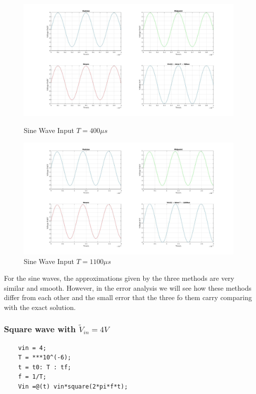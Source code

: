 \documentclass[11pt,a4paper]{article}
\begin{document}
\begin{figure}[h]
	\vspace{-5mm}
	\centering
	\includegraphics[width=\textwidth]{Ex1_Figs/sin400.jpg}
	\vspace{-10mm}
	\caption{Sine Wave Input $T = 400 \mu s$}
	\label{fig:RL7}
	\includegraphics[width=\textwidth]{Ex1_Figs/sin1100.jpg}
	\vspace{-10mm}
	\caption{Sine Wave Input $T = 1100 \mu s$}
	\label{fig:RL8}
\end{figure}
For the sine waves, the approximations given by the three methods are very similar and smooth. However, in the error analysis we will see how these methods differ from each other and the small error that the three fo them carry comparing with the exact solution.


\FloatBarrier
\newpage
\subsubsection {Square wave with $\tilde{V}_{in} = 4V$}
\begin{verbatim}
    vin = 4;
    T = ***10^(-6);
    t = t0: T : tf;
    f = 1/T;
    Vin =@(t) vin*square(2*pi*f*t);
\end{verbatim}
\end{document}
